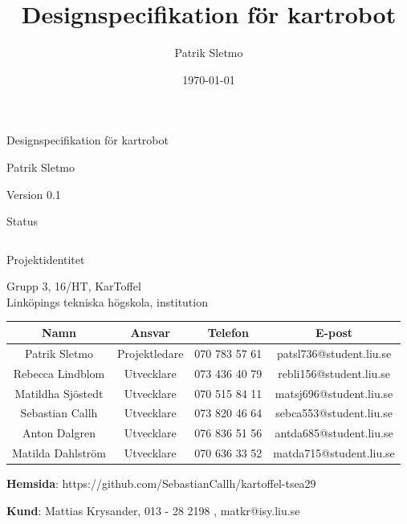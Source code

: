 \documentclass{article}
\title{Designspecifikation för kartrobot}
\author{Patrik Sletmo}
\date{\today}
\begin{document}
\thispagestyle{empty}

{
\sffamily
\centering
\large


{\huge 
Designspecifikation för kartrobot
}

{\large
Patrik Sletmo
}

{\large
Version 0.1
}

\vspace{3.5cm}

Status
\begin{center}
\begin{tabular}{ | c | c | c | } 
\hline
\end{tabular}
\end{center}
}
\clearpage

\vspace*{\fill}
{
\sffamily
\centering
\large


{\huge
Projektidentitet
}

{\large
Grupp 3, 16/HT, KarToffel \\ Linköpings tekniska högskola, institution
}

\vspace{0.5cm}

\begin{table}[H]
\centering
\begin{tabular}{ | c | c | c | c |}
\hline
Namn & Ansvar & Telefon & E-post \\
\hline
Patrik Sletmo & Projektledare & 070 783 57 61 & patsl736@student.liu.se \\
\hline
Rebecca Lindblom & Utvecklare & 073 436 40 79 & rebli156@student.liu.se \\
\hline
Matildha Sjöstedt & Utvecklare & 070 515 84 11 & matsj696@student.liu.se \\
\hline
Sebastian Callh & Utvecklare & 073 820 46 64 & sebca553@student.liu.se \\
\hline
Anton Dalgren & Utvecklare & 076 836 51 56 & antda685@student.liu.se \\
\hline
Matilda Dahlström & Utvecklare & 070 636 33 52 & matda715@student.liu.se \\
\hline
\end{tabular}
\end{table}
}

\begin{center}
\textbf{Hemsida}: https://github.com/SebastianCallh/kartoffel-tsea29
\end{center}

\begin{center}
\textbf{Kund}: Mattias Krysander, 013 - 28 2198 , matkr@isy.liu.se
\end{center}
\end{document}

